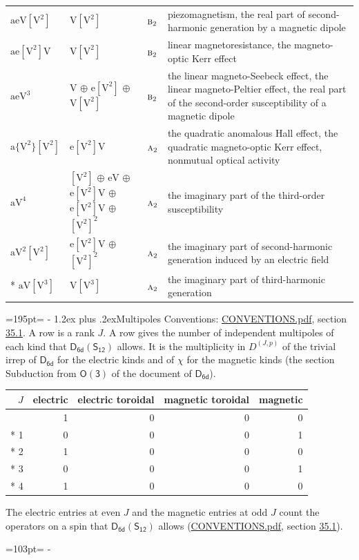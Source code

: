 \documentclass[10pt,a4paper]{article}
\makeatletter
\renewcommand\section{\@startsection{section}{1}{\z@}{-3ex plus -1ex minus -.2ex}%
  {1.2ex plus .2ex}{\normalfont\large\sffamily\bfseries\color{parttitle}}}
\newcommand{\needspace}[1]{\par\penalty-100\begingroup\dimen0=#1\relax\dimen2=\pagegoal
  \advance\dimen2-\pagetotal\ifdim\dimen0>\dimen2\relax\ifdim\dimen2>0pt\vfil\break\fi\fi
  \endgroup}
\numberwithin{equation}{section}
\newcommand{\grp}[1]{\mathsf{#1}}
\newcommand{\irr}[1]{\text{\normalfont\scshape #1}}
\newcommand{\irrJp}[2]{D^{(#1,#2)}}
\newcommand{\jahn}[1]{\mathrm{#1}}
\newlength{\fillwidth}\newlength{\cellwidth}\newlength{\colwidth}
\makeatother
\begin{document}
{\begin{longtable}{@{}lll>{\RaggedRight\arraybackslash}p{\fillwidth}@{}}
$\jahn{aeV[V^{2}]}$ & $\jahn{V[V^{2}]}$ & $\irr{b}_{2}$ & piezomagnetism, the real part of second-harmonic generation by a magnetic dipole\\
$\jahn{ae[V^{2}]V}$ & $\jahn{V[V^{2}]}$ & $\irr{b}_{2}$ & linear magnetoresistance, the magneto-optic Kerr effect\\
$\jahn{aeV^{3}}$ & $\jahn{V}$ $\oplus$ $\jahn{e[V^{2}]}$ $\oplus$ $\jahn{V[V^{2}]}$ & $\irr{b}_{2}$ & the linear magneto-Seebeck effect, the linear magneto-Peltier effect, the real part of the second-order susceptibility of a magnetic dipole\\
$\jahn{a\{V^{2}\}[V^{2}]}$ & $\jahn{e[V^{2}]V}$ & $\irr{a}_{2}$ & the quadratic anomalous Hall effect, the quadratic magneto-optic Kerr effect, nonmutual optical activity\\
$\jahn{aV^{4}}$ & $\jahn{[V^{2}]}$ $\oplus$ $\jahn{eV}$ $\oplus$ $\jahn{e[V^{2}]V}$ $\oplus$ $\jahn{e[V^{2}]V}$ $\oplus$ $\jahn{[V^{2}]^{2}}$ & $\irr{a}_{2}$ & the imaginary part of the third-order susceptibility\\
$\jahn{aV^{2}[V^{2}]}$ & $\jahn{e[V^{2}]V}$ $\oplus$ $\jahn{[V^{2}]^{2}}$ & $\irr{a}_{2}$ & the imaginary part of second-harmonic generation induced by an electric field\\*
$\jahn{aV[V^{3}]}$ & $\jahn{V[V^{3}]}$ & $\irr{a}_{2}$ & the imaginary part of third-harmonic generation\\
\bottomrule\end{longtable}}
\needspace{195pt}
\section{Multipoles}\label{s:multipoles}
Conventions: \href{../../CONVENTIONS.pdf}{CONVENTIONS.pdf}, section \href{../../CONVENTIONS.pdf\#conv.35.1}{35.1}.
A row is a rank $J$. \label{n:head.multipole.electric}\label{n:head.multipole.electric.toroidal}\label{n:head.multipole.magnetic.toroidal}\label{n:head.multipole.magnetic}A row gives the number of independent multipoles of each kind that $\grp{D_{6d}}(\grp{S_{12}})$ allows. It is the multiplicity in $\irrJp{J}{p}$ of the trivial irrep of $\grp{D_{6d}}$ for the electric kinds and of $\chi$ for the magnetic kinds (the section Subduction from $\grp{O(3)}$ of the document of \href{../../../rotation/data/pdf/D6d.pdf}{$\grp{D_{6d}}$}).
{\small\begin{longtable}{@{}rrrrr@{}}\toprule
$J$ & electric & electric toroidal & magnetic toroidal & magnetic\\\midrule\endhead
\bottomrule\endfoot\endlastfoot
0 & 1 & 0 & 0 & 0\\*
1 & 0 & 0 & 0 & 1\\*
2 & 1 & 0 & 0 & 0\\*
3 & 0 & 0 & 0 & 1\\*
4 & 1 & 0 & 0 & 0\\
\bottomrule\end{longtable}}
The electric entries at even $J$ and the magnetic entries at odd $J$ count the operators on a spin that $\grp{D_{6d}}(\grp{S_{12}})$ allows (\href{../../CONVENTIONS.pdf}{CONVENTIONS.pdf}, section \href{../../CONVENTIONS.pdf\#conv.35.1}{35.1}).
\needspace{103pt}
\end{document}
